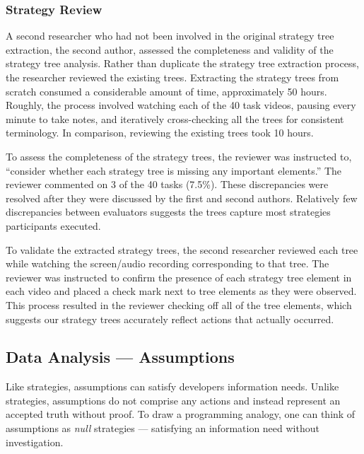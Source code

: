 \documentclass[10pt,journal,compsoc]{IEEEtran}
\begin{document}

\subsubsection{Strategy Review}
A second researcher who had not been involved in the original strategy tree extraction, the second author, assessed the completeness and validity of the strategy tree analysis. 
Rather than duplicate the strategy tree extraction process, the researcher reviewed the existing trees.
Extracting the strategy trees from scratch consumed a considerable amount of time, approximately 50 hours.
Roughly, the process involved watching each of the 40 task videos, pausing every minute to take notes, and iteratively cross-checking all the trees for consistent terminology.
In comparison, reviewing the existing trees took 10 hours.  

To assess the completeness of the strategy trees, the reviewer was instructed to, ``consider whether each strategy tree is missing any important elements.''
The reviewer commented on 3 of the 40 tasks (7.5\%).
These discrepancies were resolved after they were discussed by the first and second authors.
Relatively few discrepancies between evaluators suggests the trees capture most strategies participants executed.

To validate the extracted strategy trees, the second researcher reviewed each tree while watching the screen/audio recording corresponding to that tree.
The reviewer was instructed to confirm the presence of each strategy tree element in each video and placed a check mark next to tree elements as they were observed. 
This process resulted in the reviewer checking off all of the tree elements, which suggests our strategy trees accurately reflect actions that actually occurred. 


\subsection{Data Analysis --- Assumptions}
\label{sec:assumptionAnalysis}

Like strategies, assumptions can satisfy developers information needs.
Unlike strategies, assumptions do not comprise any actions and instead represent an accepted truth without proof.
To draw a programming analogy, one can think of assumptions as \textit{null} strategies --- satisfying an information need without investigation. 
\end{document}
